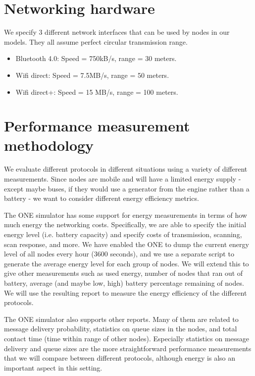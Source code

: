 \documentclass[conference]{IEEEtran}
\begin{document}
\section{Networking hardware}

We specify 3 different network interfaces that can be used by nodes in our models. They all assume perfect circular transmission range.

\begin{itemize}
  \item Bluetooth 4.0: Speed = 750kB/s, range = 30 meters.
  \item Wifi direct: Speed = 7.5MB/s, range = 50 meters.
  \item Wifi direct+: Speed = 15 MB/s, range = 100 meters.
\end{itemize}

\section{Performance measurement methodology}

We evaluate different protocols in different situations using a variety of different measurements. Since nodes are mobile and will have a limited energy supply - except maybe buses, if they would use a generator from the engine rather than a battery - we want to consider different energy efficiency metrics.

The ONE simulator has some support for energy measurements in terms of how much energy the networking costs. Specifically, we are able to specify the initial energy level (i.e. battery capacity) and specify costs of transmission, scanning, scan response, and more. We have enabled the ONE to dump the current energy level of all nodes every hour (3600 seconds), and we use a separate script to generate the average energy level for each group of nodes. We will extend this to give other measurements such as used energy, number of nodes that ran out of battery, average (and maybe low, high) battery percentage remaining of nodes. We will use the resulting report to measure the energy efficiency of the different protocols.

The ONE simulator also supports other reports. Many of them are related to message delivery probability, statistics on queue sizes in the nodes, and total contact time (time within range of other nodes). Especially statistics on message delivery and queue sizes are the more straightforward performance measurements that we will compare between different protocols, although energy is also an important aspect in this setting.
\end{document}
